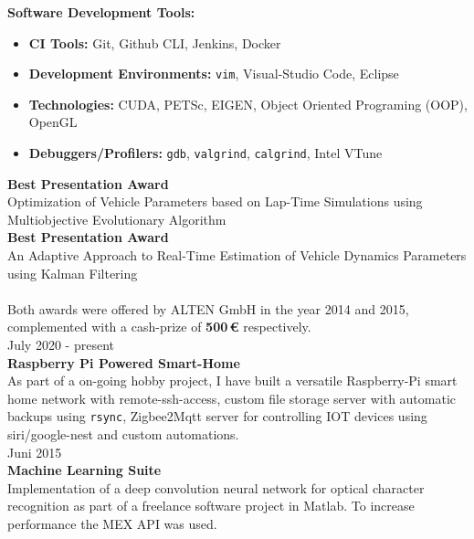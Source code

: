 \documentclass{mycv}
\begin{document}
\begin{paracol}{2}
	 {\bfseries Software Development Tools:}\par
	 \begin{itemize}
		 \item {\bfseries CI Tools:} Git, Github CLI, Jenkins, Docker\par
		 \item {\bfseries Development Environments:} \verb|vim|, Visual-Studio Code,
			 Eclipse \par
		 \item {\bfseries Technologies:} CUDA, PETSc, EIGEN,
			 Object Oriented Programing (OOP), OpenGL\par
		 \item {\bfseries Debuggers/Profilers:} \verb|gdb|, \verb|valgrind|, \verb|calgrind|,
			 Intel VTune\\
	 \end{itemize}
		

\switchcolumn
	  {\RaggedLeft \bfseries Best Presentation Award\\}
	  Optimization of Vehicle Parameters based on Lap-Time
	  Simulations using Multiobjective Evolutionary Algorithm\\

	  {\RaggedLeft \bfseries Best Presentation Award\\}
	  An Adaptive Approach to Real-Time Estimation of
	  Vehicle Dynamics Parameters using Kalman Filtering\\\\
	  {\footnotesize Both awards were offered by ALTEN GmbH in the year 2014 and 2015, complemented
			with a cash-prize of {\bfseries500\,\euro{}} respectively.}\\

	{\RaggedLeft July 2020 - present\\ \bfseries Raspberry Pi Powered Smart-Home\\}
  As part of a on-going hobby project, I have built a versatile Raspberry-Pi smart home network with remote-ssh-access,
  custom file storage server with automatic backups using \verb|rsync|, Zigbee2Mqtt server for controlling IOT devices
  using siri/google-nest and custom automations.\\

	{\RaggedLeft Juni 2015\\ \bfseries Machine Learning Suite\\}
  Implementation of a deep convolution neural network for optical character recognition as part of a
  freelance software project in Matlab. To increase performance the {MEX API} was used.\\


\end{paracol}
\end{document}
